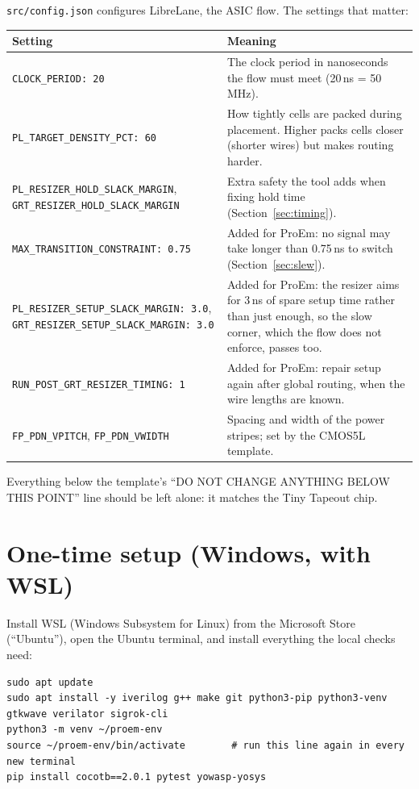 \documentclass[11pt,a4paper]{article}
\newcommand{\file}[1]{\texttt{#1}}
\begin{document}
\file{src/config.json} configures LibreLane, the ASIC flow. The settings that matter:

\begin{center}
\begin{tabularx}{\linewidth}{@{}>{\raggedright\arraybackslash}p{6.2cm}L@{}}
\toprule
Setting & Meaning \\
\midrule
\texttt{CLOCK\_PERIOD: 20} & The clock period in nanoseconds the flow must meet (20\,ns = 50\,MHz). \\
\texttt{PL\_TARGET\_DENSITY\_PCT: 60} & How tightly cells are packed during placement. Higher packs cells closer (shorter wires) but makes routing harder. \\
\texttt{PL\_RESIZER\_HOLD\_SLACK\_MARGIN}, \texttt{GRT\_RESIZER\_HOLD\_SLACK\_MARGIN} & Extra safety the tool adds when fixing hold time (Section~\ref{sec:timing}). \\
\texttt{MAX\_TRANSITION\_CONSTRAINT: 0.75} & Added for ProEm: no signal may take longer than 0.75\,ns to switch (Section~\ref{sec:slew}). \\
\texttt{PL\_RESIZER\_SETUP\_SLACK\_MARGIN: 3.0}, \texttt{GRT\_RESIZER\_SETUP\_SLACK\_MARGIN: 3.0} & Added for ProEm: the resizer aims for 3\,ns of spare setup time rather than just enough, so the slow corner, which the flow does not enforce, passes too. \\
\texttt{RUN\_POST\_GRT\_RESIZER\_TIMING: 1} & Added for ProEm: repair setup again after global routing, when the wire lengths are known. \\
\texttt{FP\_PDN\_VPITCH}, \texttt{FP\_PDN\_VWIDTH} & Spacing and width of the power stripes; set by the CMOS5L template. \\
\bottomrule
\end{tabularx}
\end{center}

Everything below the template's ``DO NOT CHANGE ANYTHING BELOW THIS POINT'' line should be left alone: it matches the Tiny Tapeout chip.

\section{One-time setup (Windows, with WSL)}\label{sec:setup}

Install WSL (Windows Subsystem for Linux) from the Microsoft Store (``Ubuntu''), open the Ubuntu terminal, and install everything the local checks need:

\begin{lstlisting}
sudo apt update
sudo apt install -y iverilog g++ make git python3-pip python3-venv gtkwave verilator sigrok-cli
python3 -m venv ~/proem-env
source ~/proem-env/bin/activate        # run this line again in every new terminal
pip install cocotb==2.0.1 pytest yowasp-yosys
\end{lstlisting}
\end{document}
